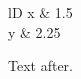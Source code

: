 \documentclass{aastex701}
\begin{document}
\begin{deluxetable}{lD}
\decimals
\startdata
x & 1.5 \\
y & 2.25
\enddata
\end{deluxetable}
Text after.
\end{document}
